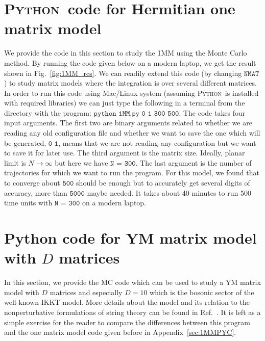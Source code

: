 \documentclass[letter,11pt]{article}
\newcommand{\PY}{\textsc{Python}}
\begin{document}
\section{\label{sec:1MMPYC}\PY~code for Hermitian one matrix model}
We provide the code in this section to study the 1MM using the Monte Carlo method. By running the code given below
on a modern laptop, we get the result shown in 
Fig.~\ref{fig:1MM_res}. We can readily extend this code (by changing $\texttt{NMAT}$) to study matrix models where the integration is over several different matrices. 
In order to run this code using Mac/Linux system (assuming  \PY~is installed with required libraries) we can just type the following in a terminal from the directory with the program:
$\texttt{python 1MM.py 0 1 300 500}$. The code takes four input arguments. The first two are binary arguments
related to whether we are reading any old configuration file and whether we want to save the one which will be 
generated, $\texttt{0 1}$, means that we are not reading any configuration but we want to save it for later use. The third argument is the matrix size. Ideally, planar limit is $ N \to \infty$ but here we have $\texttt{N = 300}$. The last argument is the 
number of trajectories for which we want to run the program. For this model, we found that to converge about $\texttt{500}$ should be enough but to accurately get several digits of accuracy, more than $\texttt{5000}$ maybe needed. It takes about 40 minutes to run 500 time units with $\texttt{N = 300}$ on a modern laptop. 
\begin{mdframed}[backgroundcolor=mauve!3] 

\end{mdframed} 
\section{\label{sec:YMC}Python code for YM matrix model with $D$ matrices} 
In this section, we provide the MC code which can be used to study a YM matrix model with $D$ matrices and especially $D=10$ which is the bosonic sector of the well-known IKKT model. More details about the model and its relation to the nonperturbative formulations of string theory can be found in Ref.~\cite{Hotta:1998en}. It is left as a simple exercise for the reader to compare the differences between this program and the one matrix model code given before in Appendix~\ref{sec:1MMPYC}. 
	\begin{mdframed}[backgroundcolor=mauve!3] 
			
	\end{mdframed} 
\end{document}
